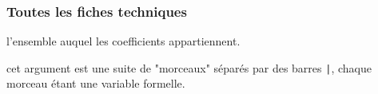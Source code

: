 \documentclass[12pt,a4paper]{article}
\begin{document}
        \subsubsection{Toutes les fiches techniques}







 l'ensemble auquel les coefficients appartiennent.

 cet argument est une suite de "morceaux" séparés par des barres \verb+|+, chaque morceau étant une variable formelle.
\end{document}
